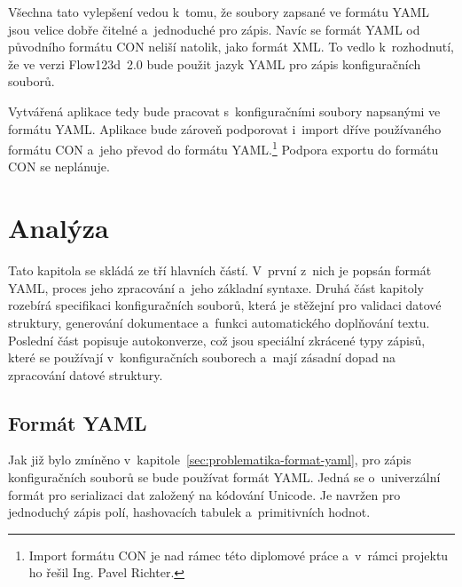 \documentclass[FM,bw,DP]{tulthesis}
\begin{document}
Všechna tato vylepšení vedou k~tomu, že soubory zapsané ve formátu \gls{YAML} jsou velice dobře čitelné a~jednoduché pro zápis. Navíc se formát \gls{YAML} od původního formátu \gls{CON} neliší natolik, jako formát \gls{XML}. To vedlo k~rozhodnutí, že ve verzi Flow123d~2.0 bude použit jazyk \gls{YAML} pro zápis konfiguračních souborů.

Vytvářená aplikace tedy bude pracovat s~konfiguračními soubory napsanými ve formátu \gls{YAML}. Aplikace bude zároveň podporovat i~import dříve používaného formátu \gls{CON} a~jeho převod do formátu \gls{YAML}.\footnote{Import formátu CON je nad rámec této diplomové práce a~v~rámci projektu ho řešil Ing. Pavel Richter.} Podpora exportu do formátu \gls{CON} se neplánuje.


\chapter{Analýza}


Tato kapitola se skládá ze tří hlavních částí. V~první z~nich je popsán formát \gls{YAML}, proces jeho zpracování a~jeho základní syntaxe. Druhá část kapitoly rozebírá specifikaci konfiguračních souborů, která je stěžejní pro validaci datové struktury, generování dokumentace a~funkci automatického doplňování textu. Poslední část popisuje autokonverze, což jsou speciální zkrácené typy zápisů, které se používají v~konfiguračních souborech a~mají zásadní dopad na zpracování datové struktury.




\section{Formát YAML}
Jak již bylo zmíněno v~kapitole~\ref{sec:problematika-format-yaml}, pro zápis konfiguračních souborů se bude používat formát \gls{YAML}. Jedná se o~univerzální formát pro serializaci dat založený na kódování Unicode. Je navržen pro jednoduchý zápis polí, hashovacích tabulek a~primitivních hodnot.
\end{document}
